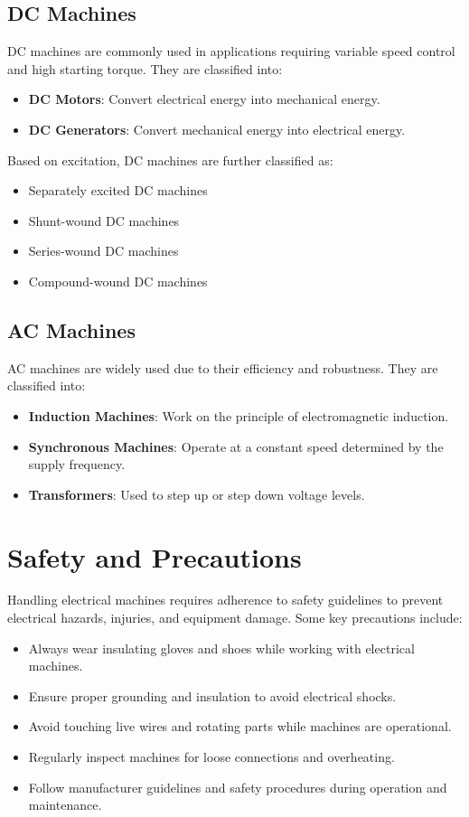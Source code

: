 \documentclass[a4paper,12pt]{article}
\begin{document}
	\subsection{DC Machines}
	DC machines are commonly used in applications requiring variable speed control and high starting torque. They are classified into:
	\begin{itemize}
		\item \textbf{DC Motors}: Convert electrical energy into mechanical energy.
		\item \textbf{DC Generators}: Convert mechanical energy into electrical energy.
	\end{itemize}
	Based on excitation, DC machines are further classified as:
	\begin{itemize}
		\item Separately excited DC machines
		\item Shunt-wound DC machines
		\item Series-wound DC machines
		\item Compound-wound DC machines
	\end{itemize}
	
	\subsection{AC Machines}
	AC machines are widely used due to their efficiency and robustness. They are classified into:
	\begin{itemize}
		\item \textbf{Induction Machines}: Work on the principle of electromagnetic induction.
		\item \textbf{Synchronous Machines}: Operate at a constant speed determined by the supply frequency.
		\item \textbf{Transformers}: Used to step up or step down voltage levels.
	\end{itemize}
	
	\section{Safety and Precautions}
	Handling electrical machines requires adherence to safety guidelines to prevent electrical hazards, injuries, and equipment damage. Some key precautions include:
	\begin{itemize}
		\item Always wear insulating gloves and shoes while working with electrical machines.
		\item Ensure proper grounding and insulation to avoid electrical shocks.
		\item Avoid touching live wires and rotating parts while machines are operational.
		\item Regularly inspect machines for loose connections and overheating.
		\item Follow manufacturer guidelines and safety procedures during operation and maintenance.
	\end{itemize}
	
\end{document}
